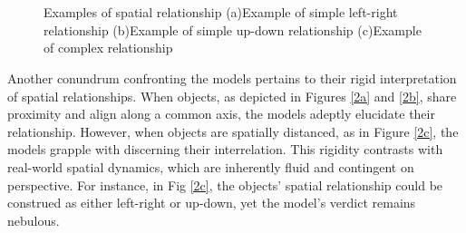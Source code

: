 \documentclass[twocolumn,11pt]{report}
\begin{document}
\begin{figure}[h]
    \centering
    \\
    \\
  \caption{Examples of spatial relationship (a)Example of simple left-right relationship (b)Example of simple up-down relationship (c)Example of complex relationship}
  \label{fig:example}
\end{figure}

Another conundrum confronting the models pertains to their rigid interpretation of spatial relationships. When objects, as depicted in Figures \ref{2a} and \ref{2b}, share proximity and align along a common axis, the models adeptly elucidate their relationship. However, when objects are spatially distanced, as in Figure \ref{2c}, the models grapple with discerning their interrelation. This rigidity contrasts with real-world spatial dynamics, which are inherently fluid and contingent on perspective. For instance, in Fig \ref{2c}, the objects' spatial relationship could be construed as either left-right or up-down, yet the model's verdict remains nebulous.
\end{document}
